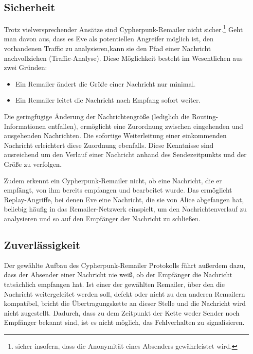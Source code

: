 \subsection{Sicherheit}
Trotz vielversprechender Ansätze sind Cypherpunk-Remailer nicht sicher.\footnote{sicher insofern, dass die Anonymität eines Absenders gewährleistet wird.}
Geht man davon aus, dass es Eve als potentiellen Angreifer möglich ist, den vorhandenen Traffic zu analysieren,kann sie den Pfad einer Nachricht nachvollziehen (Traffic-Analyse). Diese Möglichkeit besteht im Wesentlichen aus zwei Gründen: 
\begin{itemize}
\item Ein Remailer ändert die Größe einer Nachricht nur minimal.
\item Ein Remailer leitet die Nachricht nach Empfang sofort weiter.
\end{itemize}
Die geringfügige Änderung  der Nachrichtengröße (lediglich die Routing-Informationen entfallen), ermöglicht eine Zurordnung zwischen eingehenden und ausgehenden Nachrichten. Die sofortige Weiterleitung einer einkommenden Nachricht erleichtert diese Zuordnung ebenfalls. Diese Kenntnisse sind ausreichend um den Verlauf einer Nachricht anhand des Sendezeitpunkts und der Größe zu verfolgen.

Zudem erkennt ein Cypherpunk-Remailer nicht, ob eine Nachricht, die er empfängt, von ihm bereits empfangen und bearbeitet wurde. Das ermöglicht Replay-Angriffe, bei denen Eve eine Nachricht, die sie von Alice abgefangen hat, beliebig häufig in das Remailer-Netzwerk einspielt, um den Nachrichtenverlauf zu analysieren und so auf den Empfänger der Nachricht zu schließen.

\subsection{Zuverlässigkeit}
Der gewählte Aufbau des Cypherpunk-Remailer Protokolls führt außerdem dazu, dass der Absender einer Nachricht nie weiß, ob der Empfänger die Nachricht tatsächlich empfangen hat. Ist einer der gewählten Remailer, über den die Nachricht weitergeleitet werden soll, defekt oder nicht zu den anderen Remailern kompatibel, bricht die Übertragungskette an dieser Stelle und die Nachricht wird nicht zugestellt. Dadurch, dass zu dem Zeitpunkt der Kette weder Sender noch Empfänger bekannt sind, ist es nicht möglich, das Fehlverhalten zu signalisieren. 